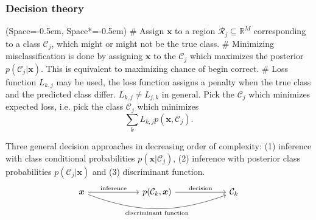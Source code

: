 \documentclass[12pt, a4paper]{article}
\newcommand{\listSpace}{-0.5em}%
\newcommand{\R}{\mathbb{R}}
\newcommand{\Reg}{\mathcal{R}}
\newcommand{\Class}{\mathcal{C}}
\newcommand{\vect}[1]{\bm{#1}}
\begin{document}
\subsubsection*{Decision theory}
\begin{easylist}[itemize]
	\ListProperties(Space=\listSpace, Space*=\listSpace)
	# Assign $\vect{x}$ to a region $\Reg_j \subseteq \R^M$ corresponding to a class $\Class_j$, which might or might not be the true class.
	# Minimizing misclassification is done by assigning $\vect{x}$ to the $\Class_j$ which maximizes the posterior $p(\Class_j | \vect{x})$.
	This is equivalent to maximizing chance of begin correct.
	# Loss function $L_{k,j}$ may be used, the loss function assigns a penalty when the true class and the predicted class differ. 
	$L_{k,j} \neq L_{j,k}$ in general.
	Pick the $\Class_j$ which minimizes expected loss, i.e. pick the class $\Class_j$ which minimizes
	\begin{equation*}
	\sum_k L_{k, j} p( \vect{x}, \Class_j).
	\end{equation*}
\end{easylist}
Three general decision approaches in decreasing order of complexity:
(1) inference with class conditional probabilities $p(\vect{x} | \Class_j)$,
(2) inference with posterior class probabilities $p(\Class_j | \vect{x})$ and
(3) discriminant function.
\[\begin{tikzcd}[column sep=6em]
\vect{x} \arrow[]{r}{\text{inference}} 
\arrow[swap, bend right = 20]{rr}{\text{discriminant function}} 
& p(\Class_k , \vect{x}) \arrow[]{r}{\text{decision}} & \Class_k
\end{tikzcd}\]
\end{document}

